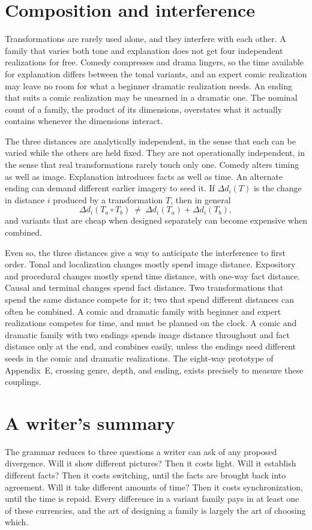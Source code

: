 \section{Composition and interference}

Transformations are rarely used alone, and they interfere with each other. A family that varies both tone and explanation does not get four independent realizations for free. Comedy compresses and drama lingers, so the time available for explanation differs between the tonal variants, and an expert comic realization may leave no room for what a beginner dramatic realization needs. An ending that suits a comic realization may be unearned in a dramatic one. The nominal count of a family, the product of its dimensions, overstates what it actually contains whenever the dimensions interact.

The three distances are analytically independent, in the sense that each can be varied while the others are held fixed. They are not operationally independent, in the sense that real transformations rarely touch only one. Comedy alters timing as well as image. Explanation introduces facts as well as time. An alternate ending can demand different earlier imagery to seed it. If $\Delta d_i(T)$ is the change in distance $i$ produced by a transformation $T$, then in general
\begin{equation}
\Delta d_i(T_a\circ T_b)\ \neq\ \Delta d_i(T_a)+\Delta d_i(T_b),
\end{equation}
and variants that are cheap when designed separately can become expensive when combined.

Even so, the three distances give a way to anticipate the interference to first order. Tonal and localization changes mostly spend image distance. Expository and procedural changes mostly spend time distance, with one-way fact distance. Causal and terminal changes spend fact distance. Two transformations that spend the same distance compete for it; two that spend different distances can often be combined. A comic and dramatic family with beginner and expert realizations competes for time, and must be planned on the clock. A comic and dramatic family with two endings spends image distance throughout and fact distance only at the end, and combines easily, unless the endings need different seeds in the comic and dramatic realizations. The eight-way prototype of Appendix~E, crossing genre, depth, and ending, exists precisely to measure these couplings.

\section{A writer's summary}

The grammar reduces to three questions a writer can ask of any proposed divergence. Will it show different pictures? Then it costs light. Will it establish different facts? Then it costs switching, until the facts are brought back into agreement. Will it take different amounts of time? Then it costs synchronization, until the time is repaid. Every difference in a variant family pays in at least one of these currencies, and the art of designing a family is largely the art of choosing which.

